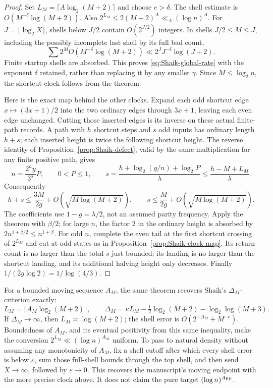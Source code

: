 \begin{proof}
Set \(L_M=\lceil A\log_2(M+2)\rceil\) and choose \(e>\delta\).
The shell estimate is \(O(M^{-\delta}\log(M+2))\).
Also \(2^{L_M}\le2(M+2)^A\ll_A(\log n)^A\).
For \(J=\lfloor\log_2X\rfloor\), shells below \(J/2\) contain
\(O(2^{J/2})\) integers. In shells \(J/2\le M\le J\), including
the possibly incomplete last shell by its full bad count,
\[
 \sum 2^M O(M^{-\delta}\log(M+2))
 \ll 2^J J^{-\delta}\log(J+2).
\]
Finite startup shells are absorbed. This proves
\eqref{eq:Shaik-global-rate} with the exponent \(\delta\) retained,
rather than replacing it by any smaller \(\gamma\).
Since \(M\le\log_2n\), the shortcut clock follows from the theorem.

Here is the exact map behind the other clocks. Expand each odd
shortcut edge \(x\mapsto(3x+1)/2\) into the two ordinary edges through
\(3x+1\), leaving each even edge unchanged. Cutting those inserted
edges is its inverse on these actual finite-path records. A path with
\(h\) shortcut steps and \(s\) odd inputs has ordinary length \(h+s\);
each inserted height is twice the following shortcut height.
The reverse identity of Proposition~\ref{prop:Shaik-defect}, valid
by the same multiplication for any finite positive path, gives
\[
 n=\frac{2^hy}{3^s}P,\qquad 0<P\le1,\qquad
 s=\frac{h+\log_2(y/n)+\log_2P}{\lambda}
 \le\frac{h-M+L_M}{\lambda}.
\]
Consequently
\[
 h+s\le\frac{3M}{2g}+O(\sqrt{M\log(M+2)}),\qquad
 s\le\frac{M}{2g}+O(\sqrt{M\log(M+2)}).
\]
The coefficients use \(1-g=\lambda/2\), not an assumed parity
frequency. Apply the theorem with \(\beta/2\); for large \(n\),
the factor \(2\) in the ordinary height is absorbed by
\(2n^{1+\beta/2}\le n^{1+\beta}\).
For odd \(n\), complete the even tail at the first shortcut crossing
of \(2^{L_M}\) and cut at odd states as in
Proposition~\ref{prop:Shaik-clock-map}. Its return count is no larger
than the total \(s\) just bounded; its landing is no larger than the
shortcut landing, and its additional halving height only decreases.
Finally \(1/(2g\log2)=1/\log(4/3)\).
\end{proof}

For a bounded moving sequence \(A_M\), the same theorem recovers
Shaik's \(\Delta_M\)-criterion exactly:
\[
 L_M=\lceil A_M\log_2(M+2)\rceil,\qquad
 \Delta_M=\kappa L_M-\tfrac12\log_2(M+2)-\log_2\log(M+3).
\]
If \(\Delta_M\to\infty\), then \(L_M\asymp\log(M+2)\);
the shell error is \(O(2^{-\Delta_M}+M^{-e})\).
Boundedness of \(A_M\), and its eventual positivity from this same
inequality, make the conversion \(2^{L_M}\ll(\log n)^{A_M}\)
uniform. To pass to natural density without assuming any monotonicity
of \(A_M\), fix a shell cutoff after which every shell error is below
\(\varepsilon\), sum those full-shell bounds through the top shell,
and then send \(X\to\infty\), followed by \(\varepsilon\to0\).
This recovers the manuscript's moving endpoint with the more precise
clock above. It does not claim the pure target \((\log n)^{A_{\rm FP}}\).


